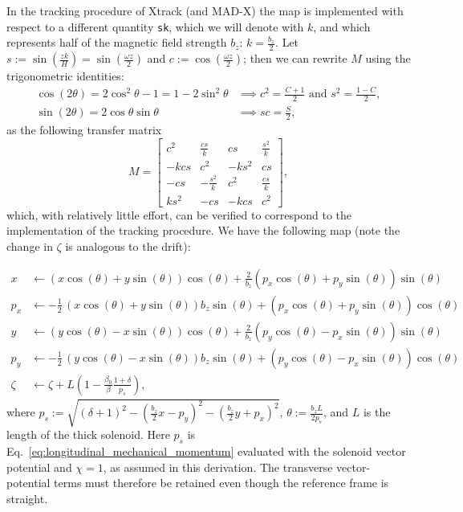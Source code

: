 In the tracking procedure of Xtrack (and MAD-X) the map is implemented with respect to a different quantity \verb|sk|, which we will denote with $k$, and which represents half of the magnetic field strength $b_z$: $k = \frac{b_z}{2}$.
Let $s := \sin(\frac{z k}{H}) = \sin(\frac{\omega z}{2})$ and $c := \cos(\frac{\omega z}{2})$; then we can rewrite $M$ using the trigonometric identities:
\begin{align*}
  \cos(2 \theta) = 2 \cos^2\theta - 1 = 1 - 2 \sin^2\theta &\implies c^2 = \frac{C + 1}{2} \text{ and } s^2 = \frac{1 - C}{2}, \\
  \sin(2 \theta) = 2 \cos\theta \sin\theta &\implies sc = \frac{S}{2},
\end{align*}
as the following transfer matrix
\[
  M = \begin{bmatrix}
    c^2 & \frac{cs}{k} & cs & \frac{s^2}{k} \\
    -kcs & c^2 & -ks^2 & cs \\
    -cs & -\frac{s^2}{k} & c^2 & \frac{cs}{k} \\
    ks^2 & -cs & -kcs & c^2
  \end{bmatrix},
\]
which, with relatively little effort, can be verified to correspond to the implementation of the tracking procedure.
We have the following map (note the change in $\zeta$ is analogous to the drift):

\begin{align*}
  x &\leftarrow {\left(x \cos\left(\theta\right) + y \sin\left(\theta\right)\right)} \cos\left(\theta\right) + \frac{2}{b_{z}} {\left(p_{x} \cos\left(\theta\right) + p_{y} \sin\left(\theta\right)\right)} \sin\left(\theta\right) \\
  p_x &\leftarrow -\frac{1}{2} \, {\left(x \cos\left(\theta\right) + y \sin\left(\theta\right)\right)} b_{z} \sin\left(\theta\right) + {\left(p_{x} \cos\left(\theta\right) + p_{y} \sin\left(\theta\right)\right)} \cos\left(\theta\right) \\
  y &\leftarrow {\left(y \cos\left(\theta\right) - x \sin\left(\theta\right)\right)} \cos\left(\theta\right) + \frac{2}{b_{z}} {\left(p_{y} \cos\left(\theta\right) - p_{x} \sin\left(\theta\right)\right)} \sin\left(\theta\right) \\
  p_y &\leftarrow -\frac{1}{2} \, {\left(y \cos\left(\theta\right) - x \sin\left(\theta\right)\right)} b_{z} \sin\left(\theta\right) + {\left(p_{y} \cos\left(\theta\right) - p_{x} \sin\left(\theta\right)\right)} \cos\left(\theta\right) \\
  \zeta &\leftarrow \zeta + L \left(1 - \frac{\beta_0}{\beta} \frac{1 + \delta}{p_s}\right),
\end{align*}
where $p_s :=  \sqrt{{\left(\delta + 1\right)}^2 - {\left(\frac{b_z}{2} x - p_{y}\right)}^{2} - {\left(\frac{b_{z}}{2} y + p_{x}\right)}^{2}}$, $\theta := \frac{b_{z} L}{2 p_s} $, and $L$ is the length of the thick solenoid.
Here $p_s$ is Eq.~\eqref{eq:longitudinal_mechanical_momentum} evaluated
with the solenoid vector potential and $\chi=1$, as assumed in this
derivation. The transverse vector-potential terms must therefore be
retained even though the reference frame is straight.


